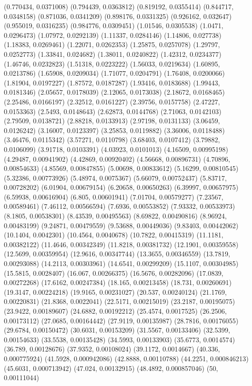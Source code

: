 {(0.770434, 0.0371008)
(0.794439, 0.0363812)
(0.819192, 0.0355414)
(0.844717, 0.0348158)
(0.871036, 0.0341209)
(0.898176, 0.0331325)
(0.926162, 0.032647)
(0.955019, 0.0316235)
(0.984776, 0.0309451)
(1.01546, 0.0305538)
(1.0471, 0.0296473)
(1.07972, 0.0292139)
(1.11337, 0.0284146)
(1.14806, 0.027738)
(1.18383, 0.0269461)
(1.22071, 0.0262353)
(1.25875, 0.0257078)
(1.29797, 0.0252773)
(1.33841, 0.024682)
(1.38011, 0.0240822)
(1.42312, 0.0234377)
(1.46746, 0.0232823)
(1.51318, 0.0223222)
(1.56033, 0.0219634)
(1.60895, 0.0213786)
(1.65908, 0.0209034)
(1.71077, 0.0204791)
(1.76408, 0.0200066)
(1.81904, 0.0197227)
(1.87572, 0.0187287)
(1.93416, 0.0183688)
(1.99443, 0.0181346)
(2.05657, 0.0178039)
(2.12065, 0.0173038)
(2.18672, 0.0168465)
(2.25486, 0.0166197)
(2.32512, 0.0161227)
(2.39756, 0.0157758)
(2.47227, 0.0153363)
(2.5493, 0.0148643)
(2.62873, 0.0144768)
(2.71063, 0.0142103)
(2.79509, 0.0138721)
(2.88218, 0.0133913)
(2.97198, 0.0131133)
(3.06459, 0.0126242)
(3.16007, 0.0123397)
(3.25853, 0.0119882)
(3.36006, 0.0118488)
(3.46476, 0.0115342)
(3.57271, 0.0110798)
(3.68403, 0.0107412)
(3.79882, 0.0106099)
(3.91718, 0.0103391)
(4.03923, 0.0101013)
(4.16509, 0.00995198)
(4.29487, 0.00941902)
(4.42869, 0.00920402)
(4.56668, 0.00896731)
(4.70896, 0.00854633)
(4.85569, 0.00847855)
(5.00698, 0.00833612)
(5.16299, 0.00810545)
(5.32386, 0.00773926)
(5.48974, 0.0075367)
(5.66079, 0.00752437)
(5.83717, 0.00728202)
(6.01904, 0.00679154)
(6.20658, 0.00650263)
(6.39997, 0.00657975)
(6.59938, 0.00616904)
(6.805, 0.00601941)
(7.01704, 0.00579277)
(7.23567, 0.00589461)
(7.46112, 0.00566594)
(7.6936, 0.00553852)
(7.93332, 0.00533973)
(8.1805, 0.00538301)
(8.43539, 0.00495563)
(8.69822, 0.00490816)
(8.96924, 0.00483199)
(9.24871, 0.00479559)
(9.53688, 0.00449036)
(9.83403, 0.00442062)
(10.1404, 0.0042301)
(10.4564, 0.0040678)
(10.7822, 0.00415319)
(11.1181, 0.00382122)
(11.4646, 0.00342349)
(11.8218, 0.00381732)
(12.1901, 0.00359558)
(12.5699, 0.00359954)
(12.9616, 0.00347744)
(13.3655, 0.00346559)
(13.7819, 0.00293088)
(14.2113, 0.00303961)
(14.6541, 0.00299209)
(15.1107, 0.00304985)
(15.5815, 0.0028407)
(16.067, 0.00266375)
(16.5676, 0.00282096)
(17.0839, 0.00272268)
(17.6162, 0.00247384)
(18.165, 0.00213458)
(18.731, 0.00260691)
(19.3147, 0.00224218)
(19.9165, 0.00231027)
(20.537, 0.00240124)
(21.1769, 0.00220831)
(21.8368, 0.0022041)
(22.5171, 0.00215019)
(23.2187, 0.00195075)
(23.9422, 0.00189607)
(24.6882, 0.00192212)
(25.4574, 0.0017525)
(26.2506, 0.00173112)
(27.0685, 0.00164442)
(27.9119, 0.00135987)
(28.7816, 0.00176055)
(29.6784, 0.00150472)
(30.6031, 0.00153209)
(31.5567, 0.00133406)
(32.5399, 0.00154633)
(33.5538, 0.00135428)
(34.5993, 0.00133903)
(35.6773, 0.0014574)
(36.789, 0.00128676)
(37.9352, 0.00108024)
(39.1172, 0.0014667)
(40.336, 0.000775924)
(41.5928, 0.000942086)
(42.8888, 0.00110788)
(44.2251, 0.000846213)
(45.6031, 0.000713942)
(47.024, 0.00132915)
(48.4892, 0.000857046)
(50, 0.00111044)
}

